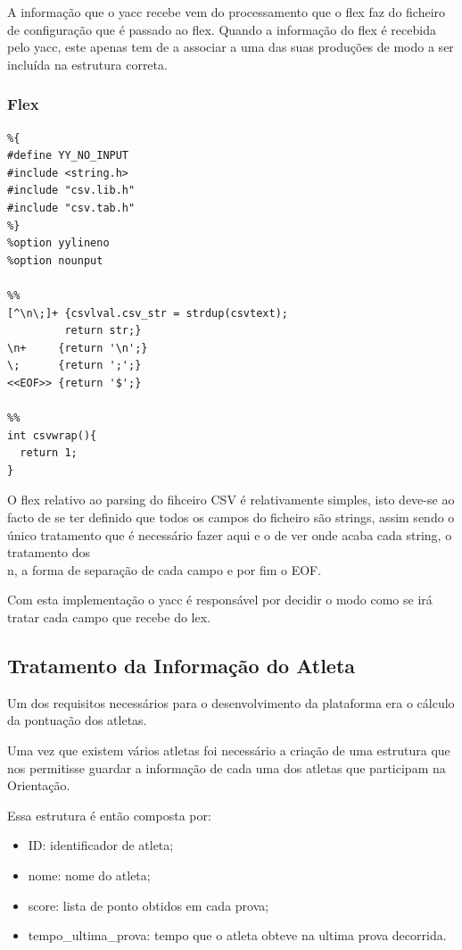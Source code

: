 \documentclass[11pt, a4paper, oneside]{article}
\begin{document}
A informação que o \textsf{yacc} recebe vem do processamento que o \textsf{flex} faz do ficheiro de configuração que é passado ao \textsf{flex}.
Quando a informação do \textsf{flex} é recebida pelo \textsf{yacc}, este apenas tem de a associar a uma das suas produções de modo a ser incluída na estrutura correta.
\newpage
\subsubsection{\textsf{Flex}}

\begin{lstlisting}
%{
#define YY_NO_INPUT
#include <string.h>
#include "csv.lib.h"
#include "csv.tab.h"
%}
%option yylineno
%option nounput

%%
[^\n\;]+ {csvlval.csv_str = strdup(csvtext);
         return str;}
\n+     {return '\n';}
\;      {return ';';}
<<EOF>> {return '$';}

%%
int csvwrap(){
  return 1;
}
\end{lstlisting}

O \textsf{flex} relativo ao parsing do fihceiro CSV é relativamente simples, isto deve-se ao facto de se ter definido que todos os campos do ficheiro são strings, assim sendo o único tratamento que é necessário fazer aqui e o de ver onde acaba cada string, o tratamento dos \\n, a forma de separação de cada campo e por fim o EOF.

Com esta implementação o \textsf{yacc} é responsável por decidir o modo como se irá tratar cada campo que recebe do \textsf{lex}.
 
\newpage
\subsection{Tratamento da Informação do Atleta}

Um dos requisitos necessários para o desenvolvimento da plataforma era o cálculo da pontuação dos atletas. 

Uma vez que existem vários atletas foi necessário a criação de uma estrutura que nos permitisse guardar a informação de cada uma dos atletas que participam na Orientação.

Essa estrutura é então composta por:
\begin{itemize}
\item \textsf{ID}: identificador de atleta;
\item \textsf{nome}: nome do atleta;
\item \textsf{score}: lista de ponto obtidos em cada prova;
\item \textsf{tempo\_ultima\_prova}: tempo que o atleta obteve na ultima prova decorrida.
\end{itemize}
\end{document}
